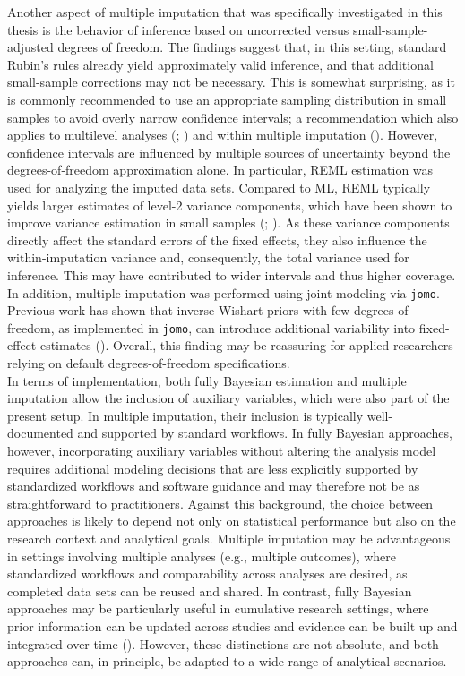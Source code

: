 \documentclass[
  letterpaper,
  11pt,
  english,
  singlespacing,
  headsepline,
  openany]{MastersDoctoralThesis}
\begin{document}
Another aspect of multiple imputation that was specifically investigated
in this thesis is the behavior of inference based on uncorrected versus
small-sample-adjusted degrees of freedom. The findings suggest that, in
this setting, standard Rubin's rules already yield approximately valid
inference, and that additional small-sample corrections may not be
necessary. This is somewhat surprising, as it is commonly recommended to
use an appropriate sampling distribution in small samples to avoid
overly narrow confidence intervals; a recommendation which also applies
to multilevel analyses (; ) and within
multiple imputation ().
However, confidence intervals are influenced by multiple sources of
uncertainty beyond the degrees-of-freedom approximation alone. In
particular, REML estimation was used for analyzing the imputed data
sets. Compared to ML, REML typically yields larger estimates of level-2
variance components, which have been shown to improve variance
estimation in small samples (;
). As these
variance components directly affect the standard errors of the fixed
effects, they also influence the within-imputation variance and,
consequently, the total variance used for inference. This may have
contributed to wider intervals and thus higher coverage. In addition,
multiple imputation was performed using joint modeling via
\texttt{jomo}. Previous work has shown that inverse Wishart priors with
few degrees of freedom, as implemented in \texttt{jomo}, can introduce
additional variability into fixed-effect estimates
(). Overall, this finding
may be reassuring for applied researchers relying on default
degrees-of-freedom specifications.\\
In terms of implementation, both fully Bayesian estimation and multiple
imputation allow the inclusion of auxiliary variables, which were also
part of the present setup. In multiple imputation, their inclusion is
typically well-documented and supported by standard workflows. In fully
Bayesian approaches, however, incorporating auxiliary variables without
altering the analysis model requires additional modeling decisions that
are less explicitly supported by standardized workflows and software
guidance and may therefore not be as straightforward to practitioners.
Against this background, the choice between approaches is likely to
depend not only on statistical performance but also on the research
context and analytical goals. Multiple imputation may be advantageous in
settings involving multiple analyses (e.g., multiple outcomes), where
standardized workflows and comparability across analyses are desired, as
completed data sets can be reused and shared. In contrast, fully
Bayesian approaches may be particularly useful in cumulative research
settings, where prior information can be updated across studies and
evidence can be built up and integrated over time
(). However, these
distinctions are not absolute, and both approaches can, in principle, be
adapted to a wide range of analytical scenarios.
\end{document}
